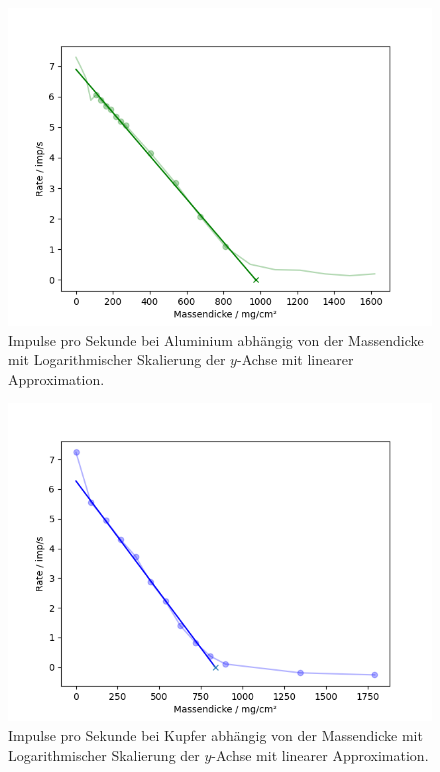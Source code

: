 \documentclass{article}
\begin{document}
\begin{figure}[H]
\centering
\includegraphics[scale=0.6]{Al_imp_log_regression_converted_x.png}
\caption{Impulse pro Sekunde bei Aluminium abhängig von der Massendicke mit Logarithmischer Skalierung der $y$-Achse mit linearer Approximation.}
\label{fig:al_imp_log_regr}
\end{figure}


\begin{figure}[H]
\centering
\includegraphics[scale=0.6]{Cu_imp_log_regression_converted_x.png}
\caption{Impulse pro Sekunde bei Kupfer abhängig von der Massendicke mit Logarithmischer Skalierung der $y$-Achse mit linearer Approximation.}
\label{fig:cu_imp_log_regr}
\end{figure}
\end{document}
